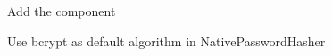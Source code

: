 
\begin{DoxyItemize}
\item Add the component
\item Use {\ttfamily bcrypt} as default algorithm in {\ttfamily Native\+Password\+Hasher} 
\end{DoxyItemize}